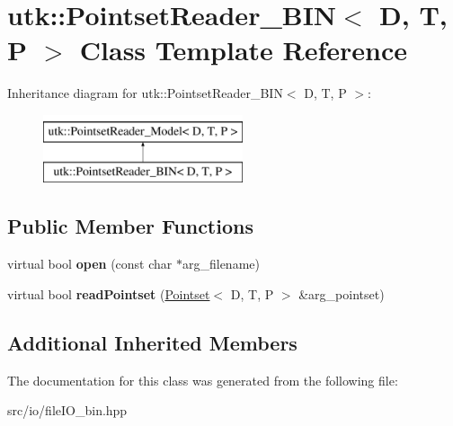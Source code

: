 \hypertarget{classutk_1_1PointsetReader__BIN}{\section{utk\-:\-:Pointset\-Reader\-\_\-\-B\-I\-N$<$ D, T, P $>$ Class Template Reference}
\label{classutk_1_1PointsetReader__BIN}
}
Inheritance diagram for utk\-:\-:Pointset\-Reader\-\_\-\-B\-I\-N$<$ D, T, P $>$\-:\begin{figure}[H]
\begin{center}
\leavevmode
\includegraphics[height=2.000000cm]{classutk_1_1PointsetReader__BIN}
\end{center}
\end{figure}
\subsection*{Public Member Functions}
\begin{DoxyCompactItemize}
\item 
\hypertarget{classutk_1_1PointsetReader__BIN_ac8112c87f757f8a1bba413bf50c25aaf}{virtual bool {\bfseries open} (const char $\ast$arg\-\_\-filename)}\label{classutk_1_1PointsetReader__BIN_ac8112c87f757f8a1bba413bf50c25aaf}

\item 
\hypertarget{classutk_1_1PointsetReader__BIN_ac771f2e1f9648a17af9db8d859d5b89d}{virtual bool {\bfseries read\-Pointset} (\hyperlink{classutk_1_1Pointset}{Pointset}$<$ D, T, P $>$ \&arg\-\_\-pointset)}\label{classutk_1_1PointsetReader__BIN_ac771f2e1f9648a17af9db8d859d5b89d}

\end{DoxyCompactItemize}
\subsection*{Additional Inherited Members}


The documentation for this class was generated from the following file\-:\begin{DoxyCompactItemize}
\item 
src/io/file\-I\-O\-\_\-bin.\-hpp\end{DoxyCompactItemize}
